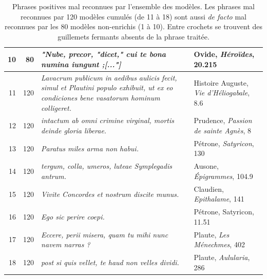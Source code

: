 \begin{table}[]
\begin{tabularx}{\textwidth}{|r|r|X|X}
    10    & 80               & \textit{"Nube, precor, "dicet," cui te bona numina iungunt ;{[..."]}}    & Ovide, \textit{Héroïdes}, 20.215                                                                            \\ \midrule
    11    & 120              & \textit{Lavacrum publicum in aedibus aulicis fecit, simul et Plautini populo exhibuit, ut ex eo condiciones bene vasatorum hominum colligeret.} & Histoire Auguste, \textit{Vie d'Héliogabale}, 8.6 \\
    12    & 120              & \textit{intactum ab omni crimine virginal, mortis deinde gloria liberae.} & Prudence, \textit{Passion de sainte Agnès}, 8                                                                       \\
    13    & 120              & \textit{Paratus miles arma non habui.} & Pétrone, \textit{Satyricon}, 130                                                                                        \\
    14    & 120              & \textit{tergum, colla, umeros, luteae Symplegadis antrum.} & Ausone, \textit{Épigrammes}, 104.9                                                                                    \\
    15    & 120              & \textit{Vivite Concordes et nostrum discite munus.} & Claudien, \textit{Epithalame}, 141                                                                                              \\
    16    & 120              & \textit{Ego sic perire coepi.} & Pétrone, Satyricon, 11.51                                                                                                                   \\
    17    & 120              & \textit{Eccere, perii misera, quam tu mihi nunc navem narras ?} & Plaute, \textit{Les Ménechmes}, 402                                                                                 \\
    18    & 120              & \textit{post si quis vellet, te haud non velles dividi.} & Plaute, \textit{Aulularia}, 286                                                                                        \\ \bottomrule
    \end{tabularx}
    \caption{Phrases positives mal reconnues par l'ensemble des modèles. Les phrases mal reconnues par 120 modèles cumulés (de 11 à 18) sont aussi \textit{de facto} mal reconnues par les 80 modèles non-enrichis  (1 à 10). Entre crochets se trouvent des guillemets fermants absents de la phrase traitée.}
    \label{tab:chap4:erreurscommunes}
\end{table}

